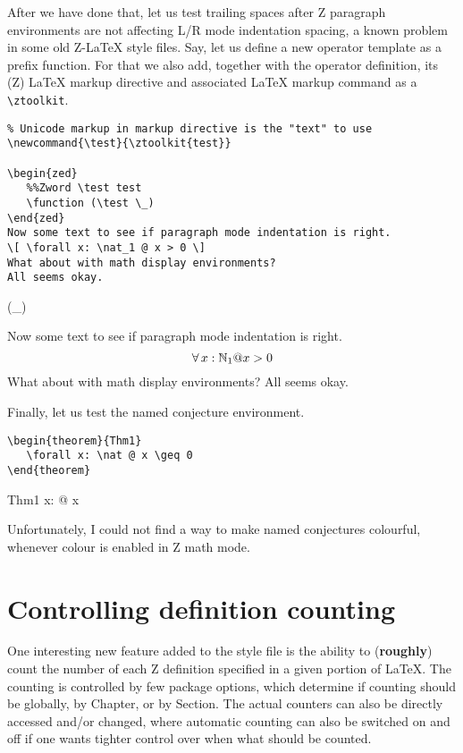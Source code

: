 \documentclass{article}
\def\gives{\endquote\endgroup\egroup}
\begin{document}
After we have done that, let us test trailing spaces after Z paragraph environments are not
affecting L/R mode indentation spacing, a known problem in some old Z-\LaTeX{} style files.
Say, let us define a new operator template as a prefix function. For that we also add,
together with the operator definition, its (Z) \LaTeX{} markup directive and associated
\LaTeX{} markup command as a \verb|\ztoolkit|.
%
\begin{demo}
\begin{verbatim}
% Unicode markup in markup directive is the "text" to use
\newcommand{\test}{\ztoolkit{test}}

\begin{zed}
   %%Zword \test test
   \function (\test \_)
\end{zed}
Now some text to see if paragraph mode indentation is right.
\[ \forall x: \nat_1 @ x > 0 \]
What about with math display environments?
All seems okay.
\end{verbatim}
\gives
\newcommand{\test}{}

\begin{zed}
   \function (\test \_)
\end{zed}
Now some text to see if paragraph mode indentation is right.
\[ \forall x: \nat_1 @ x > 0 \]
What about with math display environments? All seems okay.
\end{demo}
%
Finally, let us test the named conjecture environment.
%
\begin{demo}
\begin{verbatim}
\begin{theorem}{Thm1}
   \forall x: \nat @ x \geq 0
\end{theorem}
\end{verbatim}
\gives
\begin{theorem}{Thm1}
   \forall x: \nat @ x 
\end{theorem}
\end{demo}
%
Unfortunately, I could not find a way to make named conjectures
colourful, whenever colour is enabled in Z math mode.

\section{Controlling definition counting}\label{sec:cztcount}

One interesting new feature added to the style file is the ability
to (\textbf{roughly}) count the number of each Z definition specified
in a given portion of \LaTeX. The counting is controlled by few
package options, which determine if counting should be globally,
by Chapter, or by Section. The actual counters can also be directly
accessed and/or changed, where automatic counting can also be switched
on and off if one wants tighter control over when what should be counted.
\end{document}
